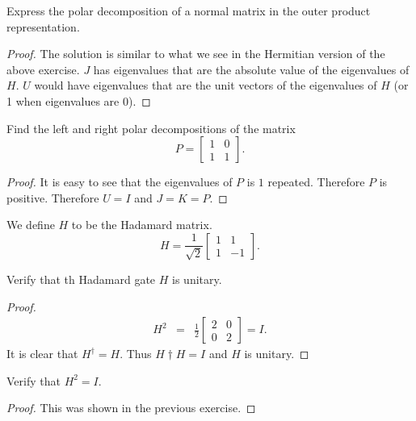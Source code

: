 \documentclass{article}
\begin{document}
\begin{exercise}
  Express the polar decomposition of a normal matrix in the outer product representation.
  \begin{proof}
    The solution is similar to what we see in the Hermitian version of the above exercise. $J$ has eigenvalues that are the absolute value of the eigenvalues of $H$. $U$ would have eigenvalues that are the unit vectors of the eigenvalues of $H$ (or 1 when eigenvalues are 0).
  \end{proof}
\end{exercise}

\begin{exercise}
  Find the left and right polar decompositions of the matrix
  \[
  P=\begin{bmatrix}
    1&0 \\
    1&1
  \end{bmatrix}.
  \]
  \begin{proof}
    It is easy to see that the eigenvalues of $P$ is $1$ repeated. Therefore $P$ is positive. Therefore $U=I$ and $J=K=P$.
  \end{proof}
\end{exercise}

\begin{definition}
  We define $H$ to be the Hadamard matrix.
  \[
    H=\frac{1}{\sqrt2}\begin{bmatrix}
    1&1 \\
    1&-1
  \end{bmatrix}.
    \]
\end{definition}

\begin{exercise}
  Verify that th Hadamard gate $H$ is unitary.
  \begin{proof}
    \begin{eqnarray*}
      H^2&=&\frac{1}{2}\begin{bmatrix}
        2&0 \\
        0&2
      \end{bmatrix} = I.
    \end{eqnarray*}
    It is clear that $H^\dagger = H$. Thus $H\dagger H=I$ and $H$ is unitary.
  \end{proof}
\end{exercise}

\begin{exercise}
  Verify that $H^2=I$.
  \begin{proof}
    This was shown in the previous exercise.
  \end{proof}
\end{exercise}
\end{document}
